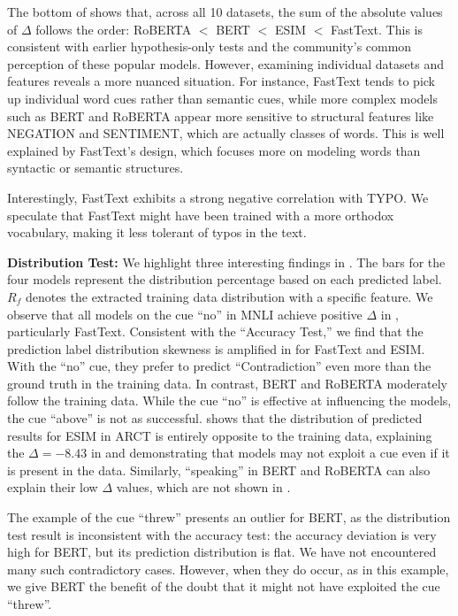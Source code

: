 The bottom of  shows that, 
across all 10 datasets, the sum of the absolute 
values of $\Delta$ follows the order: RoBERTA $<$ BERT $<$ ESIM $<$ FastText. This is consistent with earlier hypothesis-only tests and the community's common perception of these popular models. However, examining individual datasets and features reveals a more nuanced situation. For instance, FastText tends to pick up individual word cues rather than semantic cues, while more complex models such as BERT and RoBERTA appear more sensitive to structural features like NEGATION and SENTIMENT, which are actually classes of words. This is well explained by FastText's design, which focuses more on modeling words than syntactic or semantic structures.

Interestingly, FastText exhibits a strong negative correlation with TYPO. We speculate that FastText might have been trained with a more orthodox vocabulary, making it less tolerant of typos in the text.

\textbf{Distribution Test:} We highlight three interesting findings in . The bars for the four models represent the distribution percentage based on each predicted label. $R_f$ denotes the extracted training data distribution with a specific feature. We observe that all models on the cue ``no'' in MNLI achieve positive $\Delta$ in , particularly FastText. Consistent with the ``Accuracy Test,'' we find that the prediction label distribution skewness is amplified in  for FastText and ESIM. With the ``no'' cue, they prefer to predict ``Contradiction'' even more than the ground truth in the training data. In contrast, BERT and RoBERTA moderately follow the training data. While the cue ``no'' is effective at influencing the models, the cue ``above'' is not as successful.  shows that the distribution of predicted results for ESIM in ARCT is entirely opposite to the training data, explaining the $\Delta=-8.43$ in  and demonstrating that models may not exploit a cue even if it is present in the data. Similarly, ``speaking'' in BERT and RoBERTA can also explain their low $\Delta$ values, which are not shown in .

The example of the cue ``threw'' presents an outlier for BERT, as the distribution test result is inconsistent with the accuracy test: the accuracy deviation is very high for BERT, but its prediction distribution is flat. We have not encountered many such contradictory cases. However, when they do occur, as in this example, we give BERT the benefit of the doubt that it might not have exploited the cue ``threw''. 


